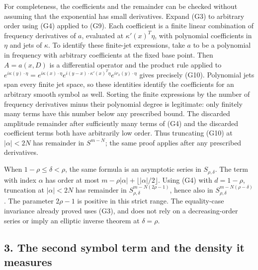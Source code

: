 \documentclass[
  11pt,
]{article}
\begin{document}
For completeness, the coefficients and the remainder can be checked
without assuming that the exponential has small derivatives. Expand (G3)
to arbitrary order using (G4) applied to (G9). Each coefficient is a
finite linear combination of frequency derivatives of \(a\), evaluated
at \(\kappa'(x)^T\eta\), with polynomial coefficients in \(\eta\) and
jets of \(\kappa\). To identify these finite-jet expressions, take \(a\)
to be a polynomial in frequency with arbitrary coefficients at the fixed
base point. Then \(A=a(x,D)\) is a differential operator and the product
rule applied to
\(e^{i\kappa(y)\cdot\eta}=e^{i\kappa(x)\cdot\eta}e^{i(y-x)\cdot\kappa'(x)^T\eta}e^{ir_x(y)\cdot\eta}\)
gives precisely (G10). Polynomial jets span every finite jet space, so
these identities identify the coefficients for an arbitrary smooth
symbol as well. Sorting the finite expressions by the number of
frequency derivatives minus their polynomial degree is legitimate: only
finitely many terms have this number below any prescribed bound. The
discarded amplitude remainder after sufficiently many terms of (G4) and
the discarded coefficient terms both have arbitrarily low order. Thus
truncating (G10) at \(|\alpha|<2N\) has remainder in \(S^{m-N}\); the
same proof applies after any prescribed derivatives.

When \(1-\rho\leq\delta<\rho\), the same formula is an asymptotic series
in \(S_{\rho,\delta}\). The term with index \(\alpha\) has order at most
\(m-\rho|\alpha|+\lfloor|\alpha|/2\rfloor\). Using (G4) with
\(d=1-\rho\), truncation at \(|\alpha|<2N\) has remainder in
\(S^{m-N(2\rho-1)}_{\rho,\delta}\), hence also in
\(S^{m-N(\rho-\delta)}_{\rho,\delta}\). The parameter \(2\rho-1\) is
positive in this strict range. The equality-case invariance already
proved uses (G3), and does not rely on a decreasing-order series or
imply an elliptic inverse theorem at \(\delta=\rho\).

\subsection{3. The second symbol term and the density it
measures}\label{the-second-symbol-term-and-the-density-it-measures}
\end{document}
